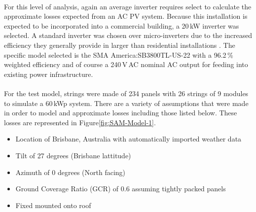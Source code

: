 \paragraph{}
For this level of analysis, again an average inverter requires select to calculate the approximate losses expected from an AC PV system. Because this installation is expected to be incorporated into a commercial building, a 20\,kW inverter was selected. A standard inverter was chosen over micro-inverters due to the increased efficiency they generally provide in larger than residential installations \cite{MicroInverterThesis}. The specific model selected is the SMA America:SB3800TL-US-22 with a 96.2\,\% weighted efficiency and of course a 240\,V\,AC nominal AC output for feeding into existing power infrastructure. 

\paragraph{}
For the test model, strings were made of 234 panels with 26 strings of 9 modules to simulate a 60\,kWp system. There are a variety of assumptions that were made in order to model and approximate losses including those listed below. These losses are represented in Figure\ref{fig:SAM-Model-1}. 

\begin{itemize}[noitemsep,nolistsep]
	\item Location of Brisbane, Australia with automatically imported weather data
	\item Tilt of 27 degrees (Brisbane lattitude)
	\item Azimuth of 0 degrees (North facing)
	\item Ground Coverage Ratio (GCR) of 0.6 assuming tightly packed panels
	\item Fixed mounted onto roof 
\end{itemize}

